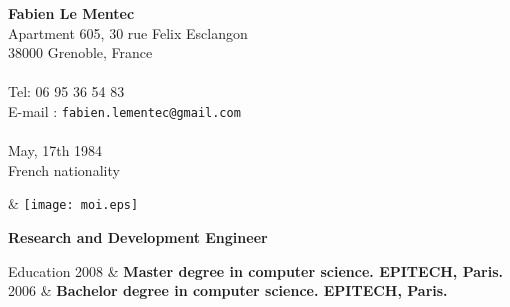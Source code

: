 \documentclass{resume}
\newcommand{\activite}[1]{\textbf{#1}\ }
\begin{document}
\begin{chapeau}
  \begin{adresse}
    \textbf{Fabien Le Mentec}\\
    Apartment 605, 30 rue Felix Esclangon \\
    38000 Grenoble, France	\\
    \ligne\\
    Tel: 06 95 36 54 83\\
    E-mail : \texttt{fabien.lementec@gmail.com}\\
    \ligne\\
    May, 17th 1984 \\
    French nationality \\
  \end{adresse}
  \begin{etatcivil}
    & \texttt{[image: moi.eps]}\\[2mm]
  \end{etatcivil}
\end{chapeau}

\vspace{0.4cm}

\begin{center}
  \textbf{\huge{Research and Development Engineer}}
\end{center}

\vspace{0.4cm}

\begin{rubriquetableau}[2cm]{Education}
  2008
  & \activite{\small{Master degree in computer science. EPITECH, Paris.}}
  \\[0.5mm]

  2006
  & \activite{\small{Bachelor degree in computer science. EPITECH, Paris.}}
  \\[0.5mm]

\end{rubriquetableau}

\vspace{0.5cm}
\end{document}
